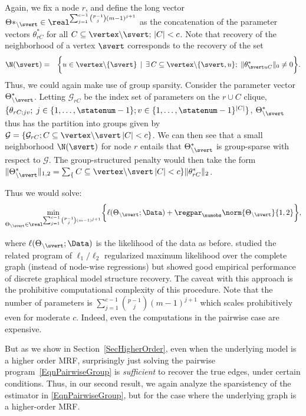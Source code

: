 Again, we fix a node $r$, and define the long vector $\Theta*_{\backslash \svert} \in \real^{\sum_{j=1}^{c-1} \binom{p-1}{j} (m-1)^{j+1}}$ as the concatenation of the parameter vectors $\theta^*_{rC}$ for all $C \subseteq \vertex \backslash \svert;\, |C| < c$. Note that recovery of the neighborhood of a vertex $\svert$ corresponds to the recovery of the set
\begin{eqnarray*}
\N(\svert) & = & \biggr \{ u \in \vertex \backslash \{\svert\} \, \mid
\, \exists \, C \subseteq \vertex \backslash \{\svert,u\} ;\; \|\theta^*_{\svert u C}\|_0 \neq 0 \biggr \}.
\end{eqnarray*}
Thus, we could again make use of group sparsity. Consider the parameter vector $\Theta^*_{\backslash \svert}$. Letting $\mathcal{G}_{rC}$ be the index set of parameters on the  ${r} \cup C$ clique, $\{\theta_{rC;jv} ;\; j \in \{1,\hdots,\statenum - 1\}; v \in \{1,\hdots,\statenum - 1\}^{|C|}\}$, $\Theta^*_{\backslash \svert}$ thus has the partition into groups given by $\mathcal{G} = \{ \mathcal{G}_{rC}; C \subseteq  \vertex \backslash \svert\, |C| < c\}$. We can then see that a small neighborhood $\N(\svert)$ for node $r$ entails that $\Theta^*_{\backslash \svert}$ is group-sparse with respect to $\mathcal{G}$. The group-structured penalty would then take the form $\|\Theta^*_{\backslash \svert}\|_{1,2} = \sum_\{C \subseteq  \vertex \backslash \svert\, |C| < c\} \|\theta^*_{rC}\|_{2}$.

Thus we would solve:
\begin{equation}
\label{EqnGroupHigherOrder}
\min_{\Theta_{\backslash \svert} \in \real^{\sum_{j=1}^{c-1} \binom{p-1}{j} (m-1)^{j+1}}} \biggr\{ \ell(\Theta_{\backslash \svert}; \Data) +
	\regpar_\numobs \norm{\Theta_{\backslash \svert}}{1,2} \biggr\},
\end{equation}

where $\ell(\Theta_{\backslash \svert}; \Data)$ is the likelihood of the data as before. \citet{Dahinden07,Dahinden10} studied the related program of $\ell_1/\ell_2$ regularized maximum likelihood over the complete graph (instead of node-wise regressions) but showed good empirical performance of discrete graphical model structure recovery. The caveat with this approach is the prohibitive computational complexity of this procedure. Note that the number of parameters is $\sum_{j=1}^{c-1} \binom{p-1}{j} (m-1)^{j+1}$ which scales prohibitively even for moderate $c$. Indeed, even the computations in the pairwise case are expensive.

But as we show in Section~\ref{SecHigherOrder}, even when the underlying model is a higher order MRF, surprisingly just solving the pairwise program~\eqref{EqnPairwiseGroup} is \emph{sufficient} to recover the true edges, under certain conditions. Thus, in our second result,
we again analyze the sparsistency of the estimator in \eqref{EqnPairwiseGroup}, but for the case where the underlying graph is a higher-order MRF.







